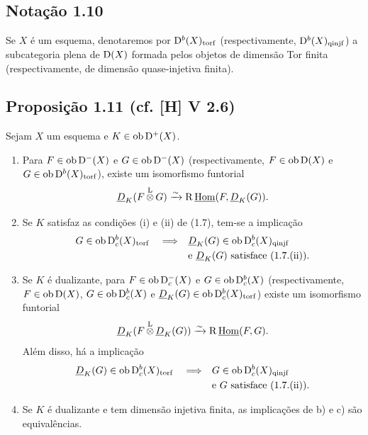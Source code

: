 \subsection*{Notação 1.10}
Se $X$ é um esquema, denotaremos por $\mathrm{D}^{b}(X)_{\mathrm{torf}}$ (respectivamente, $\mathrm{D}^{b}(X)_{\mathrm{qinjf}}$) a subcategoria plena de $\mathrm{D}(X)$ formada pelos objetos de dimensão Tor finita (respectivamente, de dimensão quase-injetiva finita).

\subsection*{Proposição 1.11 (cf. [H] V 2.6)}
Sejam $X$ um esquema e $K \in \operatorname{ob} \mathrm{D}^{+}(X)$.
\begin{enumerate}
\item[a)] Para $F \in \operatorname{ob} \mathrm{D}^{-}(X)$ e $G \in \operatorname{ob} \mathrm{D}^{-}(X)$ (respectivamente, $F \in \operatorname{ob} \mathrm{D}(X)$ e $G \in \operatorname{ob} \mathrm{D}^{b}(X)_{\mathrm{torf}}$), existe um isomorfismo funtorial
\[
\underline{D}_K(F \mathop{\otimes}\limits^{\mathrm{L}} G) \xrightarrow{\sim} \mathrm{R}\,\underline{\operatorname{Hom}}(F, \underline{D}_K(G)).
\]
\item[b)] Se $K$ satisfaz as condições (i) e (ii) de (1.7), tem-se a implicação
\[
\begin{aligned}
G \in \operatorname{ob} \mathrm{D}_c^{b}(X)_{\mathrm{torf}} \quad \Longrightarrow \quad
&\underline{D}_K(G) \in \operatorname{ob} \mathrm{D}_c^{b}(X)_{\mathrm{qinjf}} \\
&\text{e } \underline{D}_K(G) \text{ satisface (1.7.(ii)).}
\end{aligned}
\]
\item[c)] Se $K$ é dualizante, para $F \in \operatorname{ob} \mathrm{D}_c^{-}(X)$ e $G \in \operatorname{ob} \mathrm{D}_c^{b}(X)$ (respectivamente, $F \in \operatorname{ob} \mathrm{D}(X)$, $G \in \operatorname{ob} \mathrm{D}_c^{b}(X)$ e $\underline{D}_K(G) \in \operatorname{ob} \mathrm{D}_c^{b}(X)_{\mathrm{torf}}$) existe um isomorfismo funtorial
\[
\underline{D}_K(F \mathop{\otimes}\limits^{\mathrm{L}} \underline{D}_K(G)) \xrightarrow{\sim} \mathrm{R}\,\underline{\operatorname{Hom}}(F, G).
\]
Além disso, há a implicação
\[
\begin{aligned}
\underline{D}_K(G) \in \operatorname{ob} \mathrm{D}_c^{b}(X)_{\mathrm{torf}} \quad \Longrightarrow \quad
&G \in \operatorname{ob} \mathrm{D}_c^{b}(X)_{\mathrm{qinjf}} \\
&\text{e } G \text{ satisface (1.7.(ii)).}
\end{aligned}
\]
\item[d)] Se $K$ é dualizante e tem dimensão injetiva finita, as implicações de b) e c) são equivalências.
\end{enumerate}

